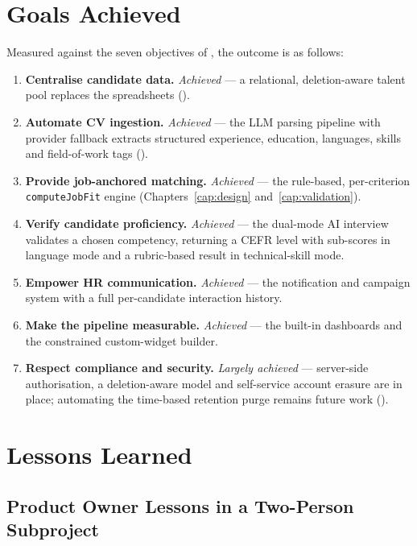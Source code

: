 \section{Goals Achieved}
\label{sec:concl-goals}

Measured against the seven objectives of , the
outcome is as follows:

\begin{enumerate}
	\item \textbf{Centralise candidate data.} \emph{Achieved} --- a
	relational, deletion-aware talent pool replaces the spreadsheets
	().
	\item \textbf{Automate CV ingestion.} \emph{Achieved} --- the
	LLM parsing pipeline with provider fallback extracts structured
	experience, education, languages, skills and field-of-work tags
	().
	\item \textbf{Provide job-anchored matching.} \emph{Achieved} --- the
	rule-based, per-criterion \texttt{computeJobFit} engine
	(Chapters~\ref{cap:design} and~\ref{cap:validation}).
	\item \textbf{Verify candidate proficiency.} \emph{Achieved} --- the
	dual-mode AI interview validates a chosen competency, returning a CEFR
	level with sub-scores in language mode
	and a rubric-based result in technical-skill mode.
	\item \textbf{Empower HR communication.} \emph{Achieved} --- the
	notification and campaign system with a full per-candidate interaction
	history.
	\item \textbf{Make the pipeline measurable.} \emph{Achieved} --- the
	built-in dashboards and the constrained custom-widget builder.
	\item \textbf{Respect compliance and security.} \emph{Largely
	achieved} --- server-side authorisation, a deletion-aware model and
	self-service account erasure are in place; automating the time-based
	retention purge remains future work
	().
\end{enumerate}


\section{Lessons Learned}
\label{sec:concl-lessons}

\subsection{Product Owner Lessons in a Two-Person Subproject}
\label{sec:concl-po}

